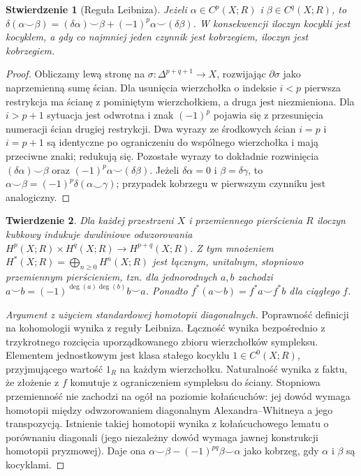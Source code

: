 \documentclass[11pt,a4paper,oneside]{report}
\theoremstyle{plain}
\newtheorem{twierdzenie}{Twierdzenie}[section]
\newtheorem{stwierdzenie}[twierdzenie]{Stwierdzenie}
\theoremstyle{definition}
\theoremstyle{remark}
\begin{document}
\begin{stwierdzenie}[Reguła Leibniza]
Jeżeli $\alpha\in C^p(X;R)$ i $\beta\in C^q(X;R)$, to
$\delta(\alpha\smile\beta)
=(\delta\alpha)\smile\beta+(-1)^p\alpha\smile(\delta\beta)$.
W konsekwencji iloczyn kocykli jest kocyklem, a gdy co najmniej
jeden czynnik jest kobrzegiem, iloczyn jest kobrzegiem.
\end{stwierdzenie}
\begin{proof}
Obliczamy lewą stronę na $\sigma:\Delta^{p+q+1}\to X$,
rozwijając $\partial\sigma$ jako naprzemienną sumę ścian.
Dla usunięcia wierzchołka o indeksie $i<p$ pierwsza restrykcja
ma ścianę z pominiętym wierzchołkiem, a druga jest niezmieniona.
Dla $i>p+1$ sytuacja jest odwrotna i znak $(-1)^p$ pojawia się
z przesunięcia numeracji ścian drugiej restrykcji.
Dwa wyrazy ze środkowych ścian $i=p$ i $i=p+1$ są identyczne
po ograniczeniu do wspólnego wierzchołka i mają przeciwne znaki;
redukują się. Pozostałe wyrazy to dokładnie rozwinięcia
$(\delta\alpha)\smile\beta$ oraz $(-1)^p\alpha\smile(\delta\beta)$.
Jeżeli $\delta\alpha=0$ i $\beta=\delta\gamma$, to
$\alpha\smile\beta=(-1)^p\delta(\alpha\smile\gamma)$;
przypadek kobrzegu w pierwszym czynniku jest analogiczny.
\end{proof}

\begin{twierdzenie}
Dla każdej przestrzeni $X$ i przemiennego pierścienia $R$ iloczyn
kubkowy indukuje dwuliniowe odwzorowania
$H^p(X;R)\times H^q(X;R)\to H^{p+q}(X;R)$.
Z tym mnożeniem $H^*(X;R)=\bigoplus_{n\geq0}H^n(X;R)$ jest
łącznym, unitalnym, \emph{stopniowo przemiennym} pierścieniem,
tzn. dla jednorodnych $a,b$ zachodzi
$a\smile b=(-1)^{\deg(a)\deg(b)}b\smile a$.
Ponadto $f^*(a\smile b)=f^*a\smile f^*b$ dla ciągłego $f$.
\end{twierdzenie}
\begin{proof}[Argument z użyciem standardowej homotopii diagonalnych]
Poprawność definicji na kohomologii wynika z reguły Leibniza.
Łączność wynika bezpośrednio z trzykrotnego rozcięcia
uporządkowanego zbioru wierzchołków sympleksu.
Elementem jednostkowym jest klasa stałego kocyklu
$1\in C^0(X;R)$, przyjmującego wartość $1_R$ na każdym
wierzchołku. Naturalność wynika z faktu, że złożenie z $f$
komutuje z ograniczeniem sympleksu do ściany.
Stopniowa przemienność nie zachodzi na ogół na poziomie
kołańcuchów: jej dowód wymaga homotopii między
odwzorowaniem diagonalnym Alexandra--Whitneya a jego
transpozycją. Istnienie takiej homotopii wynika z kołańcuchowego lematu
o porównaniu diagonali (jego niezależny dowód wymaga jawnej
konstrukcji homotopii pryzmowej). Daje ona
$\alpha\smile\beta-(-1)^{pq}\beta\smile\alpha$ jako kobrzeg,
gdy $\alpha$ i $\beta$ są kocyklami.
\end{proof}
\end{document}
